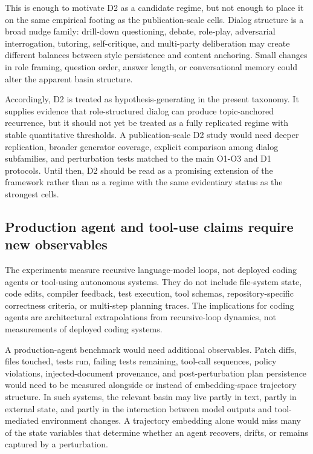 \documentclass{article}
\theoremstyle{plain}
\theoremstyle{definition}
\begin{document}
This is enough to motivate D2 as a candidate regime, but not enough to place it on the same empirical footing as the publication-scale cells. Dialog structure is a broad nudge family: drill-down questioning, debate, role-play, adversarial interrogation, tutoring, self-critique, and multi-party deliberation may create different balances between style persistence and content anchoring. Small changes in role framing, question order, answer length, or conversational memory could alter the apparent basin structure.

Accordingly, D2 is treated as hypothesis-generating in the present taxonomy. It supplies evidence that role-structured dialog can produce topic-anchored recurrence, but it should not yet be treated as a fully replicated regime with stable quantitative thresholds. A publication-scale D2 study would need deeper replication, broader generator coverage, explicit comparison among dialog subfamilies, and perturbation tests matched to the main O1-O3 and D1 protocols. Until then, D2 should be read as a promising extension of the framework rather than as a regime with the same evidentiary status as the strongest cells.

\subsection{Production agent and tool-use claims require new observables}

The experiments measure recursive language-model loops, not deployed coding agents or tool-using autonomous systems. They do not include file-system state, code edits, compiler feedback, test execution, tool schemas, repository-specific correctness criteria, or multi-step planning traces. The implications for coding agents are architectural extrapolations from recursive-loop dynamics, not measurements of deployed coding systems.

A production-agent benchmark would need additional observables. Patch diffs, files touched, tests run, failing tests remaining, tool-call sequences, policy violations, injected-document provenance, and post-perturbation plan persistence would need to be measured alongside or instead of embedding-space trajectory structure. In such systems, the relevant basin may live partly in text, partly in external state, and partly in the interaction between model outputs and tool-mediated environment changes. A trajectory embedding alone would miss many of the state variables that determine whether an agent recovers, drifts, or remains captured by a perturbation.
\end{document}
